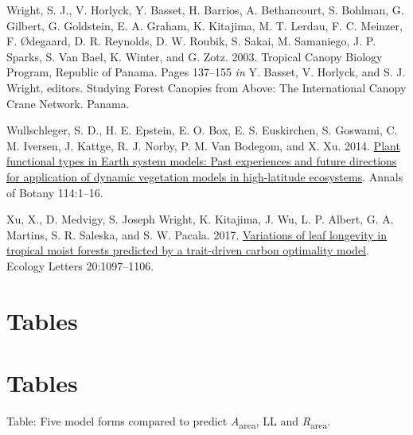 \documentclass[
  12pt,
]{article}
\begin{document}
\begin{CSLReferences}{1}{0}
\leavevmode{}%
Wright, S. J., V. Horlyck, Y. Basset, H. Barrios, A. Bethancourt, S. Bohlman, G. Gilbert, G. Goldstein, E. A. Graham, K. Kitajima, M. T. Lerdau, F. C. Meinzer, F. Ødegaard, D. R. Reynolds, D. W. Roubik, S. Sakai, M. Samaniego, J. P. Sparks, S. Van Bael, K. Winter, and G. Zotz. 2003. Tropical {Canopy Biology Program}, {Republic} of {Panama}. Pages 137--155 \emph{in} Y. Basset, V. Horlyck, and S. J. Wright, editors. Studying {Forest Canopies} from {Above}: {The International Canopy Crane Network}. {Panama}.

\leavevmode{}%
Wullschleger, S. D., H. E. Epstein, E. O. Box, E. S. Euskirchen, S. Goswami, C. M. Iversen, J. Kattge, R. J. Norby, P. M. Van Bodegom, and X. Xu. 2014. \href{https://doi.org/10.1093/aob/mcu077}{Plant functional types in {Earth} system models: {Past} experiences and future directions for application of dynamic vegetation models in high-latitude ecosystems}. Annals of Botany 114:1--16.

\leavevmode{}%
Xu, X., D. Medvigy, S. Joseph Wright, K. Kitajima, J. Wu, L. P. Albert, G. A. Martins, S. R. Saleska, and S. W. Pacala. 2017. \href{https://doi.org/10.1111/ele.12804}{Variations of leaf longevity in tropical moist forests predicted by a trait-driven carbon optimality model}. Ecology Letters 20:1097--1106.

\end{CSLReferences}

\newpage

\hypertarget{tables}{%
\section{Tables}\label{tables}}

\hypertarget{tables}{%
\section{Tables}\label{tables}}

Table: \label{tab:modeltab} Five model forms compared to predict \emph{A}\textsubscript{area}, LL and \emph{R}\textsubscript{area}.
\end{document}
